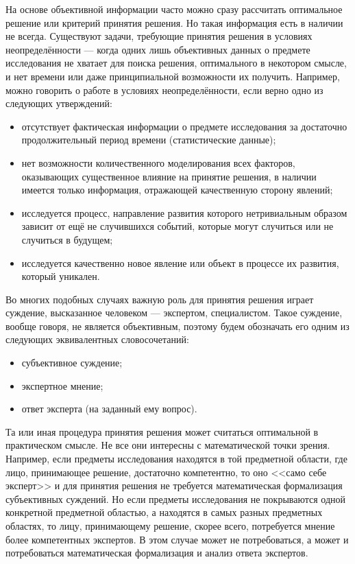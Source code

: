 На основе объективной информации часто можно сразу рассчитать оптимальное решение или критерий принятия решения. Но такая информация есть в наличии не всегда. Существуют задачи, требующие принятия решения в условиях неопределённости --- когда одних лишь объективных данных о предмете исследования не хватает для поиска решения, оптимального в некотором смысле, и нет времени или даже принципиальной возможности их  получить. Например, можно говорить о работе в условиях неопределённости, если верно одно из следующих утверждений:
\begin{itemize}
 \item отсутствует фактическая информации о предмете исследования за достаточно продолжительный период времени (статистические данные);
 \item нет возможности количественного моделирования всех факторов, оказывающих существенное влияние на принятие решения, в наличии имеется только информация, отражающей качественную сторону явлений; 
 \item исследуется процесс, направление развития которого нетривиальным образом зависит от ещё не случившихся событий, которые могут случиться или не случиться в будущем;
 \item исследуется качественно новое явление или объект в процессе их развития, который уникален.
\end{itemize}

Во многих подобных случаях важную роль для принятия решения играет суждение, высказанное человеком --- экспертом, специалистом. Такое суждение, вообще говоря, не является объективным, поэтому будем обозначать его одним из следующих эквивалентных словосочетаний:
 \begin{itemize}
	\item субъективное суждение;
	\item экспертное мнение;
	\item ответ эксперта (на заданный ему вопрос). 
 \end{itemize}

Та или иная процедура принятия решения может считаться оптимальной в практическом смысле. Не все они интересны с математической точки зрения. Например, если предметы исследования находятся в той предметной области, где лицо, принимающее решение, достаточно компетентно, то оно <<само себе эксперт>> и для принятия решения не требуется математическая формализация субъективных суждений. Но если предметы исследования не покрываются одной конкретной предметной областью, а находятся в самых разных предметных областях, то лицу, принимающему решение, скорее всего, потребуется  мнение более компетентных экспертов. В этом случае может не потребоваться, а может и потребоваться математическая формализация и анализ ответа экспертов. %
 
